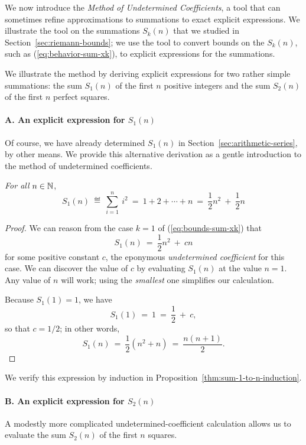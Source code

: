 We now introduce the {\em Method of Undetermined Coefficients}, a tool
that can sometimes refine approximations to summations to exact
explicit expressions.  We illustrate the tool on the summations
$S_k(n)$ that we studied in Section~\ref{sec:riemann-bounds}; we use
the tool to convert bounds on the $S_k(n)$, such as
(\ref{eq:behavior-sum-xk}), to explicit expressions for the
summations.

We illustrate the method by deriving explicit expressions for two
rather simple summations: the sum $S_1(n)$ of the first $n$ positive
integers and the sum $S_2(n)$ of the first $n$ perfect squares.

\paragraph{A. An explicit expression for $S_1(n)$}

Of course, we have already determined $S_1(n)$ in
Section~\ref{sec:arithmetic-series}, by other means.  We provide this
alternative derivation as a gentle introduction to the method of
undetermined coefficients.

\begin{prop}
{\em For all} $n \in \mathbb{N}$,
\[
S_1(n) \ \eqdef \ \sum_{i=1}^n \ i^2 
 \ = \  1 + 2 + \cdots + n
 \ = \  \frac{1}{2} n^2 \ + \ \frac{1}{2} n
\]
\end{prop}

\begin{proof}
We can reason from the case $k=1$ of (\ref{eq:bounds-sum-xk}) that
\[ S_1(n) \ = \ \frac{1}{2} n^2 \ + \ cn \]
for some positive constant $c$, the eponymous {\it undetermined
  coefficient} for this case.  We can discover the value of $c$ by
evaluating $S_1(n)$ at the value $n =1$.  Any value of $n$ will work;
using the {\em smallest} one simplifies our calculation.

Because $S_1(1) = 1$, we
have
\[ S_1(1) \ = \ 1 \ = \ \frac{1}{2} \ + \ c, \]
so that $c = 1/2$; in other words,
\[ S_1(n) \ = \ \frac{1}{2} \left( n^2 + n \right) \ = \ 
\frac{n(n+1)}{2}.
\]
\end{proof}
We verify this expression by induction in
Proposition~\ref{thm:sum-1-to-n-induction}.

\paragraph{B. An explicit expression for $S_2(n)$}

A modestly more complicated undetermined-coefficient calculation
allows us to evaluate the sum $S_2(n)$ of the first $n$ squares.

